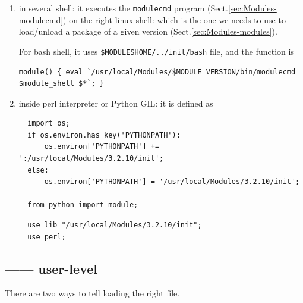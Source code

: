 \begin{enumerate} 
  
  \item  in several shell:  it executes the
\verb!modulecmd! program (Sect.\ref{sec:Modules-modulecmd}) on the right linux
shell: which is the one we needs to use to load/unload a package of a given
version (Sect.\ref{sec:Modules-modules}).

For bash shell, it uses \verb!$MODULESHOME/../init/bash!
file, and the function is 

{\tiny
\begin{verbatim}
module() { eval `/usr/local/Modules/$MODULE_VERSION/bin/modulecmd $module_shell $*`; }
\end{verbatim}
}

  \item inside perl interpreter or Python
  GIL: it is defined as
  
\begin{verbatim}
  import os;
  if os.environ.has_key('PYTHONPATH'):
      os.environ['PYTHONPATH'] += ':/usr/local/Modules/3.2.10/init';
  else:
      os.environ['PYTHONPATH'] = '/usr/local/Modules/3.2.10/init';

  from python import module;
\end{verbatim}

\begin{verbatim}
  use lib "/usr/local/Modules/3.2.10/init";
  use perl;
\end{verbatim}

\end{enumerate}


\subsection{------ user-level}
\label{sec:.bashrc_Modules}

There are two ways to tell  loading the right file.

